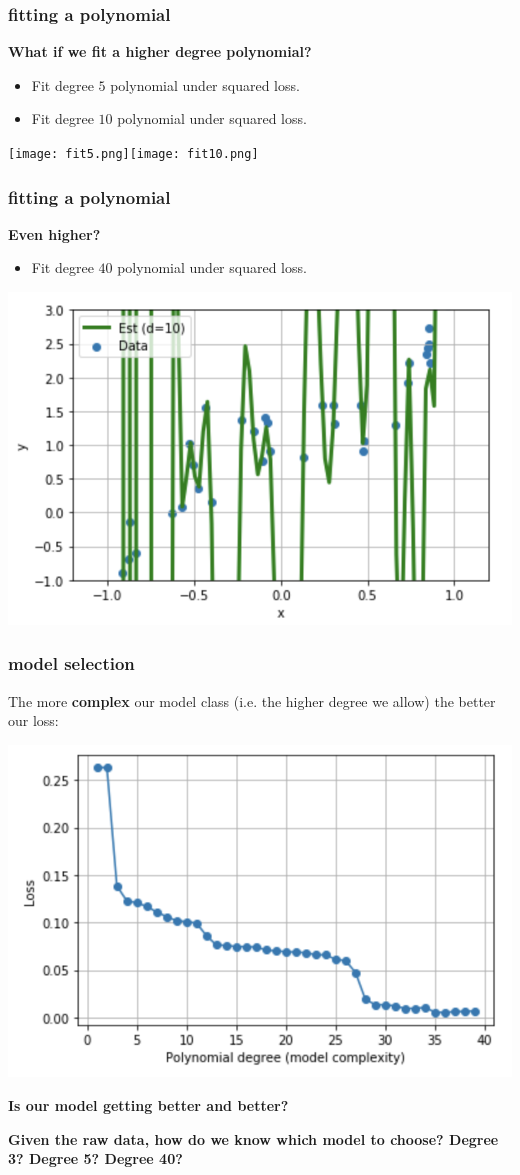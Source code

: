 \documentclass[handout,compress]{beamer}
\begin{document}
\begin{frame}
	\frametitle{fitting a polynomial}
	\textbf{What if we fit a higher degree polynomial?} 
	\begin{itemize}
		\item Fit degree $5$ polynomial under squared loss.
		\item Fit degree $10$ polynomial under squared loss.
	\end{itemize}
	\begin{center}
		\texttt{[image: fit5.png]}\texttt{[image: fit10.png]}
	\end{center}
\end{frame}

\begin{frame}
	\frametitle{fitting a polynomial}
	\textbf{Even higher?} 
	\begin{itemize}
		\item Fit degree $40$ polynomial under squared loss.
	\end{itemize}
	\begin{center}
		\includegraphics[width=.5\textwidth]{fit40.png}
	\end{center}
\end{frame}

\begin{frame}
	\frametitle{model selection}
	The more \textbf{complex} our model class (i.e. the higher degree we allow) the better our loss:
	\begin{center}
		\includegraphics[width=.5\textwidth]{loss.png}
		
		\alert{\textbf{Is our model getting better and better?}}
		
		\textbf{Given the raw data, how do we know which model to choose? Degree 3? Degree 5? Degree 40?}
	\end{center}
\end{frame}
\end{document}
